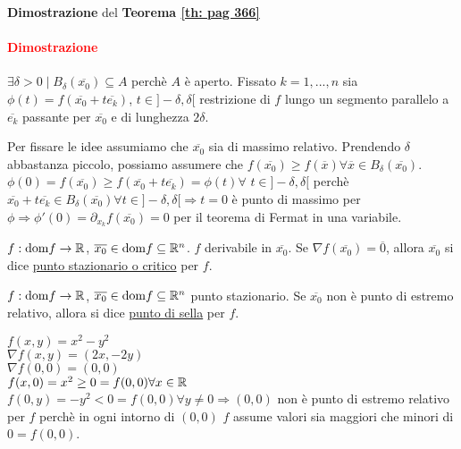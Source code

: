 \begin{dembar}
	\textbf{Dimostrazione} del \textbf{Teorema \ref{th: pag 366}}
	
	\paragraph{\textcolor{red}{Dimostrazione}}
	$\exists \delta >0 \mid B_\delta (\overline{x_0})\subseteq A$ perchè $A$ è aperto. Fissato $k=1,...,n$ sia $\phi(t)=f(\overline{x_0}+t\overline{e_k})$, $ t \in ]-\delta,\delta[$ restrizione di $f$ lungo un segmento parallelo  a $\overline{e_k}$ passante per $\overline{x_0}$ e di lunghezza $2\delta$.\\

	\segnaposto %

	Per fissare le idee assumiamo che $\overline{x_0}$ sia di massimo relativo. Prendendo $\delta$ abbastanza piccolo, possiamo assumere che $f(\overline{x_0})\geq f(\overline{x})\forall \overline{x} \in B_\delta (\overline{x_0})$.\\
	$\phi(0)=f(\overline{x_0})\geq f(\overline{x_0}+t\overline{e_k})=\phi(t)\forall \,\, t \in ]-\delta,\delta[$ perchè $\overline{x_0}+t \overline{e_k} \in B_\delta (\overline{x_0})\forall t \in ]-\delta,\delta[ \Rightarrow t=0$ è punto di massimo per $\phi \Rightarrow \phi'(0)=\partial_{x_k}f(\overline{x_0})=0$ per il teorema di Fermat in una variabile.
\end{dembar}


\begin{definition}
	$f:\mathrm{dom} f \rightarrow \mathbb{R}$, $\overline{x_0}\in \mathrm{dom} f \subseteq \mathbb{R}^n$. $f$ derivabile in $\overline{x_0}$. Se $\nabla f(\overline{x_0})=\overline{0}$, allora $\overline{x_0}$ si dice \underline{punto stazionario o critico} per $f$.
\end{definition}


\begin{definition}
	$f: \mathrm{dom} f \rightarrow \mathbb{R}$, $ \overline{x_0}\in \mathrm{dom} f \subseteq \mathbb{R}^n$ punto stazionario. Se $\overline{x_0}$ non è punto di estremo relativo, allora si dice \underline{punto di sella} per $f$.
\end{definition}


\begin{exbar}
	$f(x,y)=x^2-y^2$\\
	$\nabla f(x,y)=(2x,-2y)$\\
	$\nabla f(0,0)=(0,0)$\\
	$f(x,0)=x^2\geq 0=f(0,0) \forall x \in \mathbb{R}$\\
	$f(0,y)=-y^2 < 0 =f(0,0)\forall y \neq 0 \Rightarrow (0,0)$ non è punto di estremo relativo per $f$ perchè in ogni intorno di $(0,0)$ $f$ assume valori sia maggiori che minori di $0=f(0,0)$.
\end{exbar}


